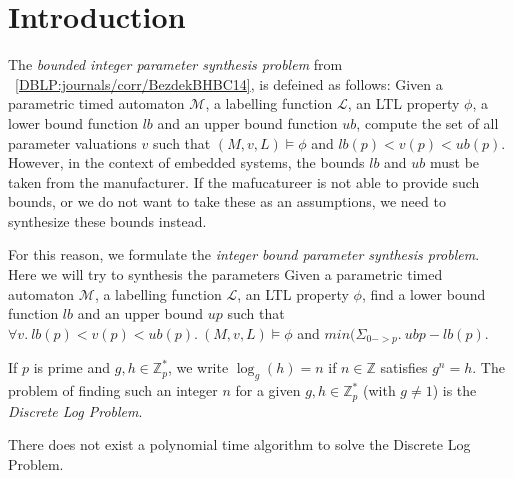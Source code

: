 \section{Introduction}

The \textit{bounded integer parameter synthesis problem} from ~\ref{DBLP:journals/corr/BezdekBHBC14}, is defeined as follows:
Given a parametric timed automaton $\mathcal{M}$, a labelling
function $\mathcal{L}$, an LTL property $\phi$, a lower bound function $lb$ and an upper bound
function $ub$, compute the set of all parameter valuations $v$ such that $(M, v,L) \models \phi$ and $lb(p) < v(p) < ub(p)$.
However, in the context of embedded systems, the bounds $lb$ and $ub$ must be taken from the manufacturer.
If the mafucatureer is not able to provide such bounds, or we do not want to take these as an assumptions, we need to synthesize these bounds instead.

For this reason, we formulate the \textit{integer bound parameter synthesis problem}.
Here we will try to synthesis the parameters
Given a parametric timed automaton $\mathcal{M}$, a labelling function $\mathcal{L}$, an LTL property $\phi$, 
find a lower bound function $lb$ and an upper bound $up$ such that $\forall v.\ lb(p) < v(p) < ub(p).\ (M, v,L) \models \phi$ and $min(\Sigma_{0->p}.\ ub{p}-lb(p)$.

If $p$ is prime and $g,h \in {\mathbb Z}_p^*$, we write $\log_g(h) = n$ if $n \in {\mathbb Z}$ satisfies $g^n = h$. The problem of finding such an integer $n$ for a given $g,h \in {\mathbb Z}^*_p$ (with $g \neq 1$) is the \emph{Discrete Log Problem}.

\begin{conjecture} There does not exist a polynomial time algorithm to solve the Discrete Log Problem. \end{conjecture}
